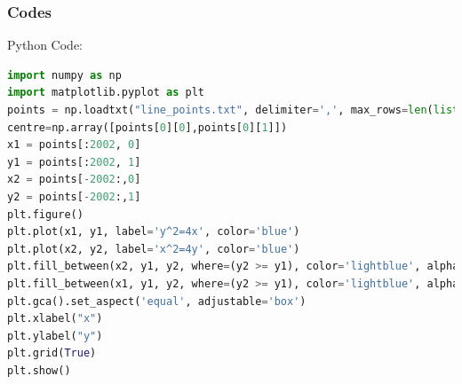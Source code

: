\documentclass{beamer}
\theoremstyle{remark}
\numberwithin{equation}{section}
\begin{document}
		\begin{frame}[fragile]
			\frametitle{Codes}
			Python Code:
			\begin{lstlisting}[language=Python, basicstyle=\scriptsize]
import numpy as np
import matplotlib.pyplot as plt
points = np.loadtxt("line_points.txt", delimiter=',', max_rows=len(list(open("./line_points.txt"))))
centre=np.array([points[0][0],points[0][1]])
x1 = points[:2002, 0]
y1 = points[:2002, 1]
x2 = points[-2002:,0]
y2 = points[-2002:,1]
plt.figure()
plt.plot(x1, y1, label='y^2=4x', color='blue')
plt.plot(x2, y2, label='x^2=4y', color='blue')
plt.fill_between(x2, y1, y2, where=(y2 >= y1), color='lightblue', alpha=0.5)
plt.fill_between(x1, y1, y2, where=(y2 >= y1), color='lightblue', alpha=0.5)
plt.gca().set_aspect('equal', adjustable='box')
plt.xlabel("x")
plt.ylabel("y")
plt.grid(True)
plt.show()
			\end{lstlisting}
		\end{frame}
	
\end{document}
